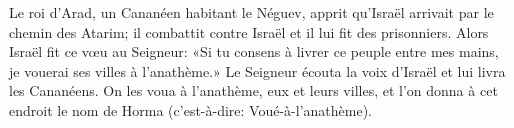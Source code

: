 Le roi d’Arad, un Cananéen habitant le Néguev,
	apprit qu’Israël arrivait par le chemin des Atarim;
	il combattit contre Israël et il lui fit des prisonniers.
Alors Israël fit ce vœu au Seigneur:
	«Si tu consens à livrer ce peuple entre mes mains,
	je vouerai ses villes à l’anathème.»
Le Seigneur écouta la voix d’Israël et lui livra les Cananéens.
On les voua à l’anathème, eux et leurs villes,
	et l’on donna à cet endroit le nom de Horma (c’est-à-dire: Voué-à-l’anathème).
